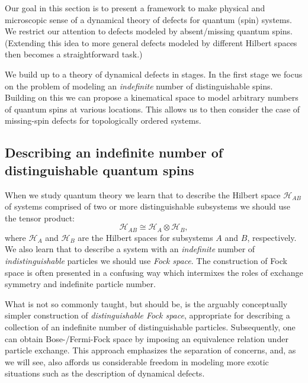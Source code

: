 \label{Gauging}

Our goal in this section is to present a framework to make physical and microscopic sense of a dynamical theory of defects for quantum (spin) systems. We restrict our attention to defects modeled by absent/missing quantum spins. (Extending this idea to more general defects modeled by different Hilbert spaces then becomes a straightforward task.)

We build up to a theory of dynamical defects in stages. In the first stage we focus on the problem of modeling an \emph{indefinite} number of distinguishable spins. Building on this we can propose a kinematical space to model arbitrary numbers of quantum spins at various locations. This allows us to then consider the case of missing-spin defects for topologically ordered systems.

\subsection{Describing an indefinite number of distinguishable quantum spins}

When we study quantum theory we learn that to describe the Hilbert space $\mathcal{H}_{AB}$ of systems comprised of two or more distinguishable subsystems we should use the tensor product:
\begin{equation}
	\mathcal{H}_{AB} \cong \mathcal{H}_A\otimes \mathcal{H}_B,
\end{equation}
where $\mathcal{H}_A$ and $\mathcal{H}_B$ are the Hilbert spaces for subsystems $A$ and $B$, respectively. We also learn that to describe a system with an \emph{indefinite} number of \emph{indistinguishable} particles we should use \emph{Fock space}. The construction of Fock space is often presented in a confusing way which intermixes the roles of exchange symmetry and indefinite particle number.

What is not so commonly taught, but should be, is the arguably conceptually simpler construction of \emph{distinguishable Fock space}, appropriate for describing a collection of an indefinite number of distinguishable particles. Subsequently, one can obtain Bose-/Fermi-Fock space by imposing an equivalence relation under particle exchange. This approach emphasizes the separation of concerns, and, as we will see, also affords us considerable freedom in modeling more exotic situations such as the description of dynamical defects.

